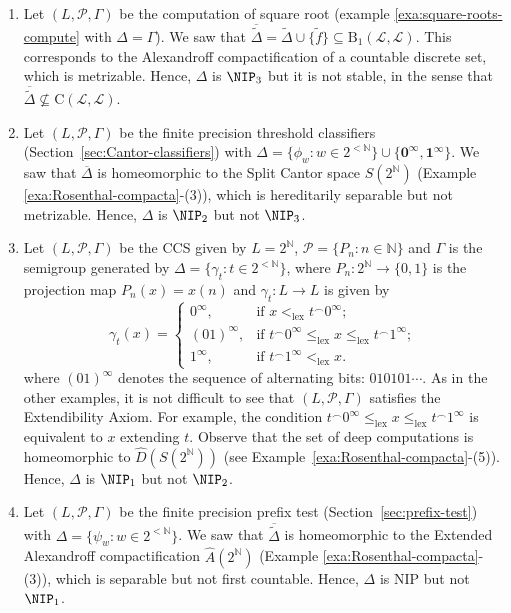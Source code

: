 \begin{example}\label{exa:NIP-levels}
\hfill
\begin{enumerate}
    \item Let $(L,\mathcal{P},\Gamma)$ be the computation of square root (example \ref{exa:square-roots-compute} with $\Delta=\Gamma$).
    We saw that $\overline{\tilde{\Delta}}=\tilde{\Delta}\cup\{\tilde{f}\}\subseteq \mathrm{B}_1(\mathcal{L},\mathcal{L})$.
    This corresponds to the Alexandroff compactification of a countable discrete set, which is metrizable. Hence, $\Delta$ is $\NIP_3$ but it is not stable, in the sense that $\overline{\tilde{\Delta}}\not\subseteq \mathrm{C}(\mathcal{L},\mathcal{L})$.

    \item Let $(L,\mathcal{P},\Gamma)$ be the finite precision threshold classifiers (Section~\ref{sec:Cantor-classifiers}) with $\Delta=\{\phi_w:w\in 2^{<\mathbb{N}}\}\cup\{\mathbf{0^\infty},\mathbf{1^\infty}\}$.
    We saw that $\overline{\Delta}$ is homeomorphic to the Split Cantor space $S(2^\mathbb{N})$ (Example \ref{exa:Rosenthal-compacta}-(3)), which is hereditarily separable but not metrizable.
    Hence, $\Delta$ is $\NIP_2$ but not $\NIP_3$.

    \item Let $(L,\mathcal{P},\Gamma)$ be the CCS given by $L=2^{\mathbb{N}}$, $\mathcal{P}=\{P_n:n\in\mathbb{N}\}$ and $\Gamma$ is the semigroup generated by $\Delta=\{\gamma_t:t\in 2^{<\mathbb{N}}\}$, where $P_n\colon 2^\mathbb{N}\to\{0,1\}$ is the projection map $P_n(x)=x(n)$ and $\gamma_t\colon L\to L$ is given by
    \[
	\gamma_t(x)=\begin{cases}
        0^\infty, & \text{if }x<_{\text{lex}}t^\frown0^\infty;\\
        (01)^\infty, & \text{if }t^\frown0^\infty\leq_{\text{lex}} x \leq_{\text{lex}} t^\frown1^\infty;\\
        1^\infty, & \text{if }t^\frown1^\infty<_{\text{lex}}x.
    \end{cases}
    \]
    where $(01)^\infty$ denotes the sequence of alternating bits: $010101\cdots$. 
    As in the other examples, it is not difficult to see that $(L,\mathcal{P},\Gamma)$ satisfies the Extendibility Axiom.
    For example, the condition $t^\frown0^\infty\leq_{\text{lex}} x \leq_{\text{lex}} t^\frown1^\infty$ is equivalent to $x$ extending $t$.
    Observe that the set of deep computations is homeomorphic to $\hat{D}(S(2^{\mathbb{N}}))$ (see Example~\ref{exa:Rosenthal-compacta}-(5)).
    Hence, $\Delta$  is $\NIP_1$ but not $\NIP_2$.

    \item Let $(L,\mathcal{P},\Gamma)$ be the finite precision prefix test (Section~\ref{sec:prefix-test}) with $\Delta=\{\psi_w:w\in 2^{<\mathbb{N}}\}$.
    We saw that $\overline{\tilde{\Delta}}$ is homeomorphic to the Extended Alexandroff compactification $\hat{A}(2^\mathbb{N})$ (Example \ref{exa:Rosenthal-compacta}-(3)), which is separable but not first countable.
    Hence, $\Delta$ is NIP but not $\NIP_1$.
\end{enumerate}
\end{example}

